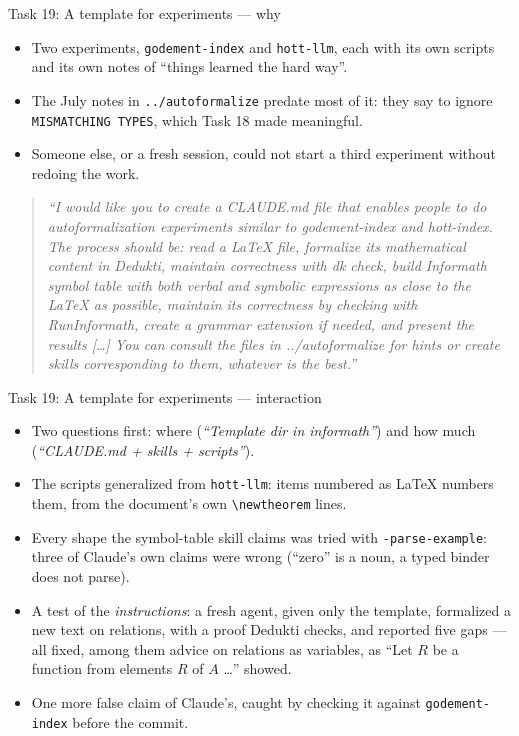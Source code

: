 \documentclass[10pt,aspectratio=169]{beamer}
\newcommand{\bad}[1]{\textcolor{warn}{#1}}
\newcommand{\prompt}[1]{\begin{quote}\small\itshape ``#1''\end{quote}}
\begin{document}
\begin{frame}{Task 19: A template for experiments --- why}
  \begin{itemize}
    \item Two experiments, \texttt{godement-index} and \texttt{hott-llm}, each with
          its own scripts and its own notes of ``things learned the hard way''.
    \item The July notes in \texttt{../autoformalize} predate most of it:
          they say to ignore \texttt{MISMATCHING TYPES}, which Task 18 made meaningful.
    \item Someone else, or a fresh session, could not start a third experiment
          without redoing the work.
  \end{itemize}
  \prompt{I would like you to create a CLAUDE.md file that enables people to do
    autoformalization experiments similar to godement-index and hott-index. The process
    should be: read a LaTeX file, formalize its mathematical content in Dedukti, maintain
    correctness with dk check, build Informath symbol table with both verbal and symbolic
    expressions as close to the LaTeX as possible, maintain its correctness by checking
    with RunInformath, create a grammar extension if needed, and present the results [\dots]
    You can consult the files in ../autoformalize for hints or create skills
    corresponding to them, whatever is the best.}
\end{frame}

\begin{frame}{Task 19: A template for experiments --- interaction}
  \begin{itemize}\small
    \item Two questions first: where (\emph{``Template dir in informath''}) and
          how much (\emph{``CLAUDE.md + skills + scripts''}).
    \item The scripts generalized from \texttt{hott-llm}: items numbered as LaTeX
          numbers them, from the document's own \texttt{\textbackslash newtheorem} lines.
    \item Every shape the symbol-table skill claims was tried with
          \texttt{-parse-example}: \bad{three} of Claude's own claims were wrong
          (``zero'' is a noun, a typed binder does not parse).
    \item A test of the \emph{instructions}: a fresh agent, given only the template,
          formalized a new text on relations, with a proof Dedukti checks, and reported
          five gaps --- all fixed, among them advice on relations as variables, as
          \bad{``Let $R$ be a function from elements $R$ of $A$ \dots''} showed.
    \item One more false claim of Claude's, caught by checking it against
          \texttt{godement-index} before the commit.
  \end{itemize}
\end{frame}
\end{document}
